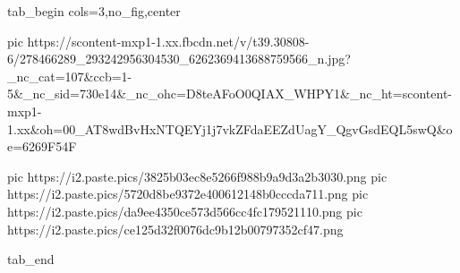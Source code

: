  
 
 
 
 


\ifcmt
  tab_begin cols=3,no_fig,center

     pic https://scontent-mxp1-1.xx.fbcdn.net/v/t39.30808-6/278466289_293242956304530_6262369413688759566_n.jpg?_nc_cat=107&ccb=1-5&_nc_sid=730e14&_nc_ohc=D8teAFoO0QIAX_WHPY1&_nc_ht=scontent-mxp1-1.xx&oh=00_AT8wdBvHxNTQEYj1j7vkZFdaEEZdUagY_QgvGsdEQL5swQ&oe=6269F54F

		 pic https://i2.paste.pics/3825b03ec8e5266f988b9a9d3a2b3030.png
		 pic https://i2.paste.pics/5720d8be9372e400612148b0cccda711.png
		 pic https://i2.paste.pics/da9ee4350ce573d566cc4fc179521110.png
		 pic https://i2.paste.pics/ce125d32f0076dc9b12b00797352cf47.png

  tab_end
\fi
